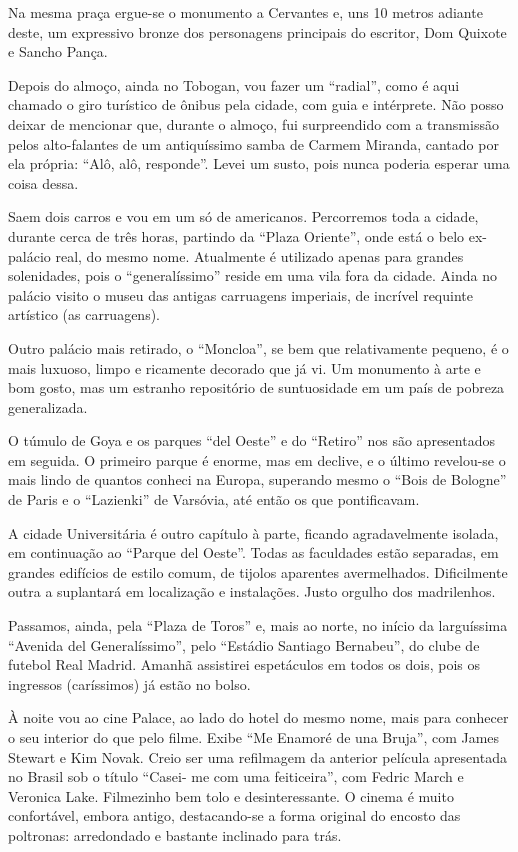 Na mesma praça ergue-se o monumento a Cervantes e, uns 10 metros adiante deste, um expressivo bronze dos personagens principais do escritor, Dom Quixote e Sancho Pança.

Depois do almoço, ainda no Tobogan, vou fazer um ``radial'', como é aqui chamado o giro turístico de ônibus pela cidade, com guia e intérprete. Não posso deixar de mencionar que, durante o almoço, fui surpreendido com a transmissão pelos alto-falantes de um antiquíssimo samba de Carmem Miranda, cantado por ela própria: ``Alô, alô, responde''. Levei um susto, pois nunca poderia esperar uma coisa dessa.

Saem dois carros e vou em um só de americanos. Percorremos toda a cidade, durante cerca de três horas, partindo da ``Plaza Oriente'', onde está o belo ex-palácio real, do mesmo nome. Atualmente é utilizado apenas para grandes solenidades, pois o ``generalíssimo'' reside em uma vila fora da cidade. Ainda no palácio visito o museu das antigas carruagens imperiais, de incrível requinte artístico (as carruagens).

Outro palácio mais retirado, o ``Moncloa'', se bem que relativamente pequeno, é o mais luxuoso, limpo e ricamente decorado que já vi. Um monumento à arte e bom gosto, mas um estranho repositório de suntuosidade em um país de pobreza generalizada.

O túmulo de Goya e os parques ``del Oeste'' e do ``Retiro'' nos são apresentados em seguida. O primeiro parque é enorme, mas em declive, e o último revelou-se o mais lindo de quantos conheci na Europa, superando mesmo o ``Bois de Bologne'' de Paris e o ``Lazienki'' de Varsóvia, até então os que pontificavam.

A cidade Universitária é outro capítulo à parte, ficando agradavelmente isolada, em continuação ao ``Parque del Oeste''. Todas as faculdades estão separadas, em grandes edifícios de estilo comum, de tijolos aparentes avermelhados. Dificilmente outra a suplantará em localização e instalações. Justo orgulho dos madrilenhos.

Passamos, ainda, pela ``Plaza de Toros'' e, mais ao norte, no início da larguíssima ``Avenida del Generalíssimo'', pelo ``Estádio Santiago Bernabeu'', do clube de futebol Real Madrid. Amanhã assistirei espetáculos em todos os dois, pois os ingressos (caríssimos) já estão no bolso.

À noite vou ao cine Palace, ao lado do hotel do mesmo nome, mais para conhecer o seu interior do que pelo filme. Exibe ``Me Enamoré de una Bruja'', com James Stewart e Kim Novak. Creio ser uma refilmagem da anterior película apresentada no Brasil sob o título ``Casei- me com uma feiticeira'', com Fedric March e Veronica Lake. Filmezinho bem tolo e desinteressante. O cinema é muito confortável, embora antigo, destacando-se a forma original do encosto das poltronas: arredondado e bastante inclinado para trás.

